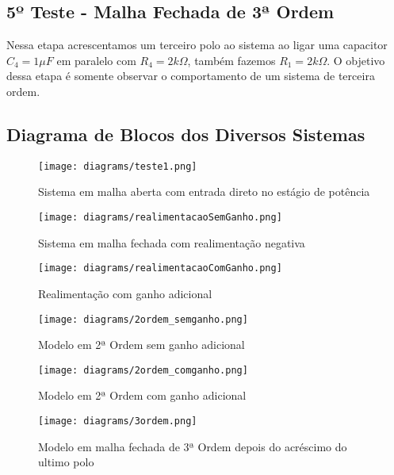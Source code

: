 \subsection{5º Teste - Malha Fechada de 3ª Ordem}
Nessa etapa acrescentamos um terceiro polo ao sistema ao ligar uma capacitor 
$C_4 = 1 \mu F$ em paralelo com $R_4 = 2k \Omega$, também fazemos $R_1 = 2k \Omega$. O objetivo dessa etapa é somente observar o comportamento de um sistema de terceira ordem. 

\subsection{Diagrama de Blocos dos Diversos Sistemas}

\begin{figure}[H]
\centering
\texttt{[image: diagrams/teste1.png]}
\caption{Sistema em malha aberta com entrada direto no estágio de potência}
\label{fig:diagram1}
\end{figure}

\begin{figure}[H]
\centering
\texttt{[image: diagrams/realimentacaoSemGanho.png]}
\caption{Sistema em malha fechada com realimentação negativa}
\label{fig:diagram2}
\end{figure}

\begin{figure}[H]
\centering
\texttt{[image: diagrams/realimentacaoComGanho.png]}
\caption{Realimentação com ganho adicional}
\label{fig:diagram3}
\end{figure}

\begin{figure}[H]
\centering
\texttt{[image: diagrams/2ordem\_semganho.png]}
\caption{Modelo em 2ª Ordem sem ganho adicional}
\label{fig:diagram4}
\end{figure}

\begin{figure}[H]
\centering
\texttt{[image: diagrams/2ordem\_comganho.png]}
\caption{Modelo em 2ª Ordem com ganho adicional}
\label{fig:diagram5}
\end{figure}

\begin{figure}[H]
\centering
\texttt{[image: diagrams/3ordem.png]}
\caption{Modelo em malha fechada de 3ª Ordem depois do acréscimo do ultimo polo}
\label{fig:diagram6}
\end{figure}